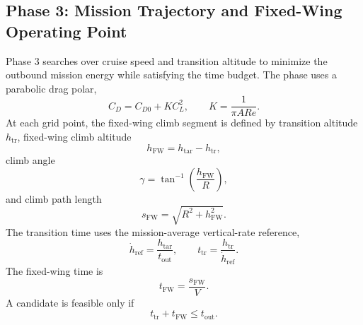 \subsection{Phase 3: Mission Trajectory and Fixed-Wing Operating Point}
\label{subsec:ppa_phase3}

Phase 3 searches over cruise speed and transition altitude to minimize the outbound mission energy while satisfying the time budget. The phase uses a parabolic drag polar,
\begin{equation}
    C_D = C_{D0}+K C_L^2,
    \qquad
    K = \frac{1}{\pi AR e}.
    \label{eq:ppa_drag_polar}
\end{equation}
At each grid point, the fixed-wing climb segment is defined by transition altitude \(h_{\mathrm{tr}}\), fixed-wing climb altitude
\begin{equation}
    h_{\mathrm{FW}} = h_{\mathrm{tar}}-h_{\mathrm{tr}},
    \label{eq:ppa_fw_altitude}
\end{equation}
climb angle
\begin{equation}
    \gamma = \tan^{-1}\left(\frac{h_{\mathrm{FW}}}{R}\right),
    \label{eq:ppa_gamma}
\end{equation}
and climb path length
\begin{equation}
    s_{\mathrm{FW}} = \sqrt{R^2+h_{\mathrm{FW}}^2}.
    \label{eq:ppa_fw_path}
\end{equation}
The transition time uses the mission-average vertical-rate reference,
\begin{equation}
    \dot{h}_{\mathrm{ref}} = \frac{h_{\mathrm{tar}}}{t_{\mathrm{out}}},
    \qquad
    t_{\mathrm{tr}}=\frac{h_{\mathrm{tr}}}{\dot{h}_{\mathrm{ref}}}.
    \label{eq:ppa_transition_time}
\end{equation}
The fixed-wing time is
\begin{equation}
    t_{\mathrm{FW}} = \frac{s_{\mathrm{FW}}}{V}.
    \label{eq:ppa_fw_time}
\end{equation}
A candidate is feasible only if
\begin{equation}
    t_{\mathrm{tr}}+t_{\mathrm{FW}} \leq t_{\mathrm{out}}.
    \label{eq:ppa_time_constraint}
\end{equation}

